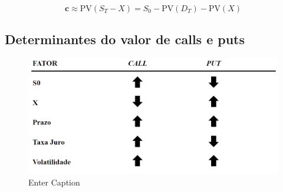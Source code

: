 \documentclass{sciposter}
\begin{document}
\begin{multicols}{3}
\[\mathbf{c} \approx \text{PV}(S_T - X) = S_0 - \text{PV}(D_T) - \text{PV}(X)\]

\vspace{0.75 cm}
\subsection*{\textbf{Determinantes do valor de calls e puts}}
\begin{figure}
    \centering
    \includegraphics[width=0.5\linewidth]{image1.png}
    \caption{Enter Caption}
    \label{fig:enter-label}
\end{figure}

\end{multicols}
\end{document}
